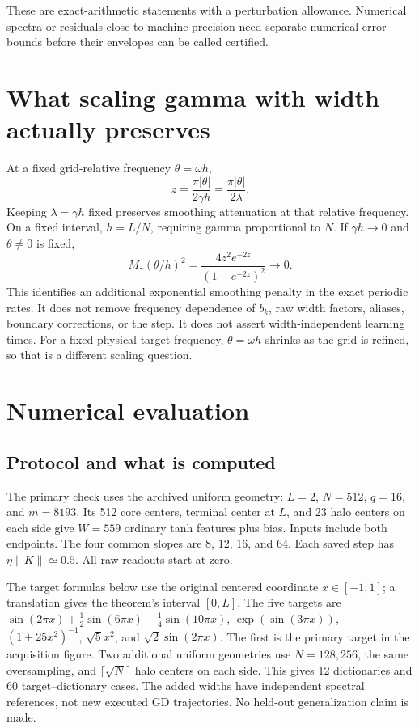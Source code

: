 \documentclass[11pt]{article}
\theoremstyle{definition}
\begin{document}
These are exact-arithmetic statements with a perturbation allowance.
Numerical spectra or residuals close to machine precision need separate
numerical error bounds before their envelopes can be called certified.

\section{What scaling gamma with width actually preserves}
At a fixed grid-relative frequency $\theta=\omega h$,
\[
z=\frac{\pi|\theta|}{2\gamma h}
=\frac{\pi|\theta|}{2\lambda}.
\]
Keeping $\lambda=\gamma h$ fixed preserves smoothing attenuation at that
relative frequency. On a fixed interval, $h=L/N$, requiring gamma
proportional to $N$. If $\gamma h\to0$ and $\theta\ne0$ is fixed,
\[
M_\gamma(\theta/h)^2
=\frac{4z^2e^{-2z}}{(1-e^{-2z})^2}\longrightarrow0.
\]
This identifies an additional exponential smoothing penalty in the exact
periodic rates. It does not remove frequency dependence of $b_k$, raw width
factors, aliases, boundary corrections, or the step. It does not assert
width-independent learning times. For a fixed physical target frequency,
$\theta=\omega h$ shrinks as the grid is refined, so that is a different
scaling question.

\section{Numerical evaluation}
\label{sec:numerical-evaluation}
\subsection*{Protocol and what is computed}
The primary check uses the archived uniform geometry: $L=2$, $N=512$,
$q=16$, and $m=8193$. Its 512 core centers, terminal center at $L$, and
23 halo centers on each side give $W=559$
ordinary tanh features plus bias. Inputs include both endpoints. The four
common slopes are 8, 12, 16, and 64. Each saved step has
$\eta\|K\|\simeq0.5$. All raw readouts start at zero.

The target formulas below use the original centered coordinate
$x\in[-1,1]$; a translation gives the theorem's interval $[0,L]$.
The five targets are
$\sin(2\pi x)+\frac12\sin(6\pi x)+\frac14\sin(10\pi x)$,
$\exp(\sin(3\pi x))$, $(1+25x^2)^{-1}$, $\sqrt5x^2$, and
$\sqrt2\sin(2\pi x)$. The first is the primary target in the acquisition
figure. Two additional uniform geometries use $N=128,256$, the same
oversampling, and $\lceil\sqrt N\rceil$ halo centers on each side. This
gives 12 dictionaries and 60 target--dictionary cases. The added widths
have independent spectral references, not new executed GD trajectories.
No held-out generalization claim is made.
\end{document}
